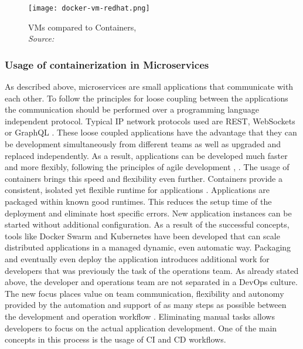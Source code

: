 \documentclass[12pt, a4paper]{article}
\begin{document}
        \begin{figure}
            \centering
            \texttt{[image: docker-vm-redhat.png]}
            \caption{\ac{VM}s compared to Containers, \\\textit{Source:~\cite{redhat_pic}}}\label{fig::vm_docker}
        \end{figure}

        \subsubsection{Usage of containerization in Microservices}
        As described above, microservices are small applications that communicate with each other. To follow the principles for loose coupling between the applications the communication should be performed over a programming language independent protocol. Typical \acs{IP} network protocols used are \ac{REST}, WebSockets or GraphQL \cite{micro}. These loose coupled applications have the advantage that they can be development simultaneously from different teams as well as upgraded and replaced independently. As a result, applications can be developed much faster and more flexibly, following the principles of agile development \cite{micro}, \cite{redhat_micro}.\newline
        The usage of containers brings this speed and flexibility even further. Containers provide a consistent, isolated yet flexible runtime for applications \cite{micro_container}. Applications are packaged within known good runtimes. This reduces the setup time of the deployment and eliminate host specific errors. New application instances can be started without additional configuration. As a result of the successful concepts, tools like Docker Swarm and Kubernetes have been developed that can scale distributed applications in a managed dynamic, even automatic way.\newline
        \noindent Packaging and eventually even deploy the application introduces additional work for developers that was previously the task of the operations team. As already stated above, the developer and operations team are not separated in a DevOps culture. The new focus places value on team communication, flexibility and autonomy provided by the automation and support of as many steps as possible between the development and operation workflow \cite{effective_devops}. Eliminating manual tasks allows developers to focus on the actual application development. One of the main concepts in this process is the usage of \ac{CI} and \ac{CD} workflows.
\end{document}
